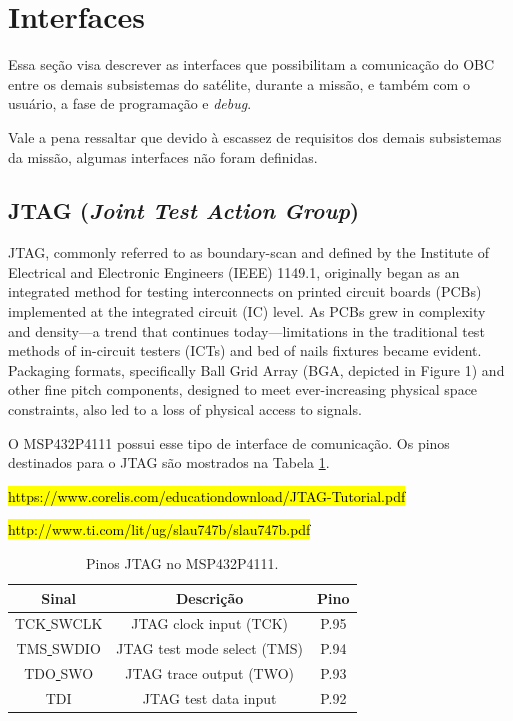 \section{Interfaces}

Essa seção visa descrever as interfaces que possibilitam a comunicação do OBC entre os demais subsistemas do satélite, durante a missão, e também com o usuário, a fase de programação e \textit{debug}.

Vale a pena ressaltar que devido à escassez de requisitos dos demais subsistemas da missão, algumas interfaces não foram definidas.

\subsection{JTAG (\textit{Joint Test Action Group})}

JTAG, commonly referred to as boundary-scan and defined by the Institute
of Electrical and Electronic Engineers (IEEE) 1149.1, originally began as an
integrated method for testing interconnects on printed circuit boards (PCBs)
implemented at the integrated circuit (IC) level. As PCBs grew in complexity
and density—a trend that continues today—limitations in the traditional test
methods of in-circuit testers (ICTs) and bed of nails fixtures became evident.
Packaging formats, specifically Ball Grid Array (BGA, depicted in Figure 1)
and other fine pitch components, designed to meet ever-increasing physical
space constraints, also led to a loss of physical access to signals.

O MSP432P4111 possui esse tipo de interface de comunicação. Os pinos destinados para o JTAG são mostrados na Tabela \ref{jtagPin}.

\hl{https://www.corelis.com/educationdownload/JTAG-Tutorial.pdf}

\hl{http://www.ti.com/lit/ug/slau747b/slau747b.pdf}

\begin{table}[h]
	\centering
	\caption{Pinos JTAG no MSP432P4111.}
	\label{jtagPin}
	\begin{tabular}{@{}ccc@{}}
		\toprule
		Sinal   & Descrição & Pino 
		\\ \midrule
		TCK\underline{ }SWCLK & JTAG clock input (TCK) & P.95
		\\ \midrule
		TMS\underline{ }SWDIO & JTAG test mode select (TMS) & P.94
		\\ \midrule
		TDO\underline{ }SWO & JTAG trace output (TWO) & P.93
		\\ \midrule
		TDI & JTAG test data input & P.92        
		\\ \bottomrule
	\end{tabular}
\end{table}

